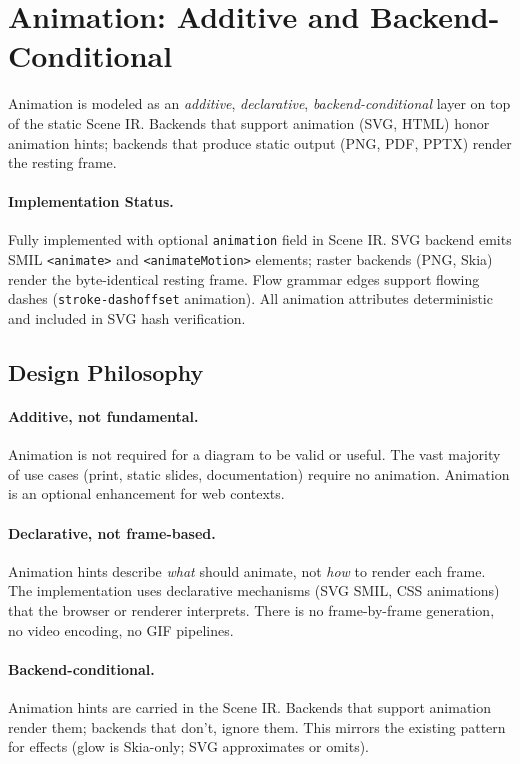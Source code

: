 \section{Animation: Additive and Backend-Conditional}
\label{sec:animation}

Animation is modeled as an \emph{additive}, \emph{declarative}, \emph{backend-conditional} layer on top of the static Scene IR. Backends that support animation (SVG, HTML) honor animation hints; backends that produce static output (PNG, PDF, PPTX) render the resting frame.

\paragraph{Implementation Status.}
Fully implemented with optional \texttt{animation} field in Scene IR. SVG backend emits SMIL \texttt{<animate>} and \texttt{<animateMotion>} elements; raster backends (PNG, Skia) render the byte-identical resting frame. Flow grammar edges support flowing dashes (\texttt{stroke-dashoffset} animation). All animation attributes deterministic and included in SVG hash verification.

\subsection{Design Philosophy}

\paragraph{Additive, not fundamental.}
Animation is not required for a diagram to be valid or useful. The vast majority of use cases (print, static slides, documentation) require no animation. Animation is an optional enhancement for web contexts.

\paragraph{Declarative, not frame-based.}
Animation hints describe \emph{what} should animate, not \emph{how} to render each frame. The implementation uses declarative mechanisms (SVG SMIL, CSS animations) that the browser or renderer interprets. There is no frame-by-frame generation, no video encoding, no GIF pipelines.

\paragraph{Backend-conditional.}
Animation hints are carried in the Scene IR. Backends that support animation render them; backends that don't, ignore them. This mirrors the existing pattern for effects (glow is Skia-only; SVG approximates or omits).

